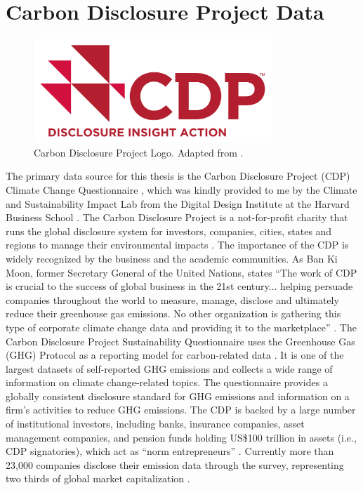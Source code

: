 \section{Carbon Disclosure Project Data}
\begin{figure}[h]
    \centering
    \includegraphics[width=0.8\textwidth]{figures/cdp_logo.png}
    \caption{Carbon Disclosure Project Logo. Adapted from \cite{CDPMain2024}.}
    \label{fig:my_label}
\end{figure}

The primary data source for this thesis is the Carbon Disclosure Project (CDP) Climate Change Questionnaire \cite{CDP2024}, which was kindly provided to me by the Climate and Sustainability Impact Lab from the Digital Design Institute at the Harvard Business School \cite{HarvardD3Lab2024}. The Carbon Disclosure Project is a not-for-profit charity that runs the global disclosure system for investors, companies, cities, states and regions to manage their environmental impacts \cite{CDPMain2024}. The importance of the CDP is widely recognized by the business and the academic communities. As Ban Ki Moon, former Secretary General of the United Nations, states ``The work of CDP is crucial to the success of global business in the 21st century... helping persuade companies throughout the world to measure, manage, disclose and ultimately reduce their greenhouse gas emissions. No other organization is gathering this type of corporate climate change data and providing it to the marketplace'' \cite{CDPMain2024}. The Carbon Disclosure Project Sustainability Questionnaire uses the Greenhouse Gas (GHG) Protocol as a reporting model for carbon-related data \cite{Andrew2011Accounting}. It is one of the largest datasets of self-reported GHG emissions and collects a wide range of information on climate change-related topics. The questionnaire provides a globally consistent disclosure standard for GHG emissions and information on a firm’s activities to reduce GHG emissions. The CDP is backed by a large number of institutional investors, including banks, insurance companies, asset management companies, and pension funds holding US\$100 trillion in assets (i.e., CDP signatories), which act as ``norm entrepreneurs'' \cite{OTT201714}. Currently more than 23,000 companies disclose their emission data through the survey, representing two thirds of global market capitalization \cite{CDPMain2024}. 

